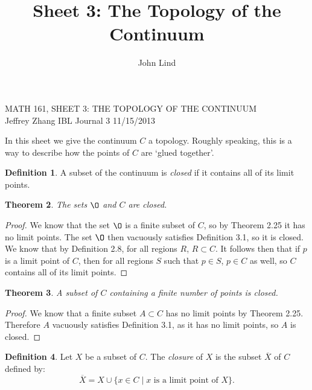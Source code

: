 \documentclass[12pt]{article}
\title{Sheet 3: The Topology of the Continuum}
\author{John Lind}
\renewcommand{\emptyset}{\O}
\renewcommand{\_}[1]{\underline{ #1 }}
\newtheorem{theorem}{Theorem}[section]
\theoremstyle{definition}
\newtheorem{definition}[theorem]{Definition}
\numberwithin{equation}{subsection}
\begin{document}
\begin{center}
{\large MATH 161, SHEET 3: THE TOPOLOGY OF THE CONTINUUM} \\ 
\vspace{.2in}  
Jeffrey Zhang IBL Journal 3 11/15/2013
\end{center}

\bigskip \bigskip


\setcounter{section}{3}   


In this sheet we give the continuum $C$ a topology.  Roughly speaking, this is a way to describe how the points of $C$ are `glued together'.  

\medskip




\begin{definition}
A subset of the continuum is \emph{closed} if it contains all of its limit points.
\end{definition}

\begin{theorem}  The sets $\emptyset$ and $C$ are closed.
\end{theorem}

\begin{proof}
We know that the set $\emptyset$ is a finite subset of $C$, so by Theorem 2.25 it has no limit points. The set $\emptyset$ then vacuously satisfies Definition 3.1, so it is closed.
We know that by Definition 2.8, for all regions $R$, $R \subset C$. It follows then that if $p$ is a limit point of $C$, then for all regions $S$ such that $p \in S$, $p \in C$ as well, so $C$ contains all of its limit points.
\end{proof}

\begin{theorem}  A subset of $C$ containing a finite number of points is closed.
\end{theorem}

\begin{proof}
We know that a finite subset $A \subset C$ has no limit points by Theorem 2.25. Therefore $A$ vacuously satisfies Definition 3.1, as it has no limit points, so $A$ is closed.
\end{proof}

\begin{definition}
Let $X$ be a subset of $C$.  The \emph{closure} of $X$ is the subset $\overline{X}$ of $C$ defined by:
\[
\overline{X} = X \cup \{x \in C \mid \text{$x$ is a limit point of $X$}\}.
\]
\end{definition}
\end{document}
